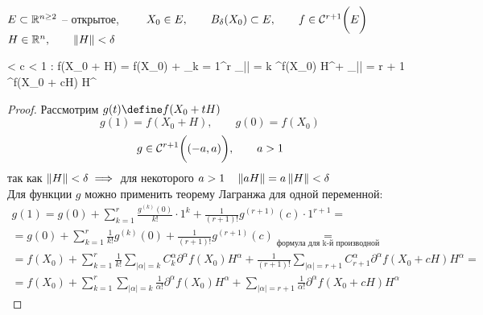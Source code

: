 \begin{theorem}
	$ E \sub \R^{n \ge 2} $ -- открытое, $ \qquad X_0 \in E, \qquad B_\delta(X_0) \sub E, \qquad f \in \Cont[r + 1]E $ \\
	$ H \in \R^n, \qquad \norm{H} < \delta $
	\begin{equ}{28}
		\implies {} < c < 1 : f(X_0 + H) = f(X_0) + \sum_{k = 1}^r \sum_{|\alpha| = k}  \partial^\alpha f(X_0) H^\alpha + \sum_{|\alpha| = r + 1}  \partial^\alpha f(X_0 + cH) H^\alpha
	\end{equ}
\end{theorem}

\begin{proof}
	Рассмотрим $ g(t) \define f(X_0 + tH) $
	$$ g(1) = f(X_0 + H), \qquad g(0) = f(X_0) $$
	$$ g \in \Cont[r + 1]{(-a, a)}, \qquad a > 1 $$
	так как $ \norm{H} < \delta \implies $ для некоторого $ a > 1 \quad \norm{aH} = a \norm{H} < \delta $ \\
	Для функции $ g $ можно применить теорему Лагранжа для одной переменной:
	\begin{multline*}
		g(1) = g(0) + \sum_{k = 1}^r \frac{g^{(k)}(0)}{k!} \cdot 1^k + \frac1{(r + 1)!}g^{(r + 1)}(c) \cdot 1^{r + 1} = \\
		= g(0) + \sum_{k = 1}^r \frac1{k!} g^{(k)}(0) + \frac1{(r + 1)!}g^{(r + 1)}(c) \underset{\text{формула для k-й производной}}= \\
		= f(X_0) + \sum_{k = 1}^r \frac1{k!} \sum_{|\alpha| = k} C_k^\alpha \partial^\alpha f(X_0) H^\alpha + \frac1{(r + 1)!} \sum_{|\alpha| = r + 1} C_{r + 1}^\alpha \partial^\alpha f(X_0 + cH) H^\alpha = \\
		= f(X_0) + \sum_{k = 1}^r \sum_{|\alpha| = k} \frac1{\alpha!} \partial^\alpha f(X_0) H^\alpha + \sum_{|\alpha| = r + 1} \frac1{\alpha!} \partial^\alpha f(X_0 + cH) H^\alpha
	\end{multline*}
\end{proof}
